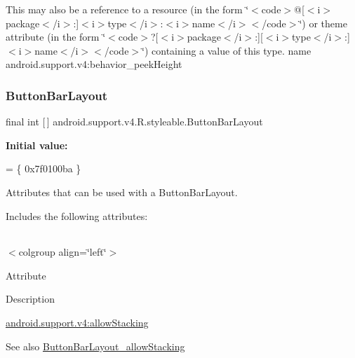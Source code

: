 This may also be a reference to a resource (in the form \char`\"{}$<$code$>$@\mbox{[}$<$i$>$package$<$/i$>$\+:\mbox{]}$<$i$>$type$<$/i$>$\+:$<$i$>$name$<$/i$>$$<$/code$>$\char`\"{}) or theme attribute (in the form \char`\"{}$<$code$>$?\mbox{[}$<$i$>$package$<$/i$>$\+:\mbox{]}\mbox{[}$<$i$>$type$<$/i$>$\+:\mbox{]}$<$i$>$name$<$/i$>$$<$/code$>$\char`\"{}) containing a value of this type.  name android.\+support.\+v4\+:behavior\+\_\+peek\+Height \mbox{\label{classandroid_1_1support_1_1v4_1_1R_1_1styleable_ae83cd99b3980a7d0569414b072a8bd02}} 
\subsubsection{\texorpdfstring{Button\+Bar\+Layout}{ButtonBarLayout}}
{\footnotesize\ttfamily final int \mbox{[}$\,$\mbox{]} android.\+support.\+v4.\+R.\+styleable.\+Button\+Bar\+Layout\hspace{0.3cm}{\ttfamily [static]}}

{\bfseries Initial value\+:}
\begin{DoxyCode}
= \{
            0x7f0100ba
        \}
\end{DoxyCode}
Attributes that can be used with a Button\+Bar\+Layout. 

Includes the following attributes\+:

\tabulinesep=1mm
\begin{longtabu} spread 0pt [c]{*{0}{|X[-1]}|}
\hline
\end{longtabu}
$<$colgroup align=\char`\"{}left\char`\"{}$>$ 

Attribute

Description 

{\ttfamily \hyperlink{classandroid_1_1support_1_1v4_1_1R_1_1styleable_a6b2ecbc44c0c2e73eb30c15bb8834cb4}{android.\+support.\+v4\+:allow\+Stacking}}

\begin{DoxySeeAlso}{See also}
\hyperlink{classandroid_1_1support_1_1v4_1_1R_1_1styleable_a6b2ecbc44c0c2e73eb30c15bb8834cb4}{Button\+Bar\+Layout\+\_\+allow\+Stacking} 
\end{DoxySeeAlso}
\mbox{\label{classandroid_1_1support_1_1v4_1_1R_1_1styleable_a6b2ecbc44c0c2e73eb30c15bb8834cb4}} 
